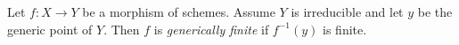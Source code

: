 \documentclass[12pt]{article}
\begin{document}
Let $f:X\rightarrow Y$ be a morphism of schemes. Assume $Y$ is irreducible and let $y$ be the generic point of $Y$. Then $f$ is \textit{generically finite} if $f^{-1}(y)$ is finite. 
\end{document}
